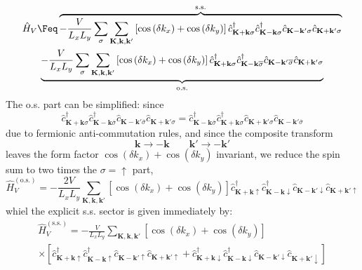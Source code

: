 \begin{multline*}
	\hat H_V \Feq 
	\overbrace{
		- \frac{V}{L_x L_y} \sum_{\sigma}
		\sum_{\mathbf{K}, \mathbf{k}, \mathbf{k}'} \left[
		\cos \left(
		\delta k_x
		\right)	+ \cos \left(
		\delta k_y
		\right)	
		\right]	\hat c_{\mathbf{K}+\mathbf{k} \sigma}^\dagger \hat c_{\mathbf{K}-\mathbf{k}\sigma}^\dagger \hat c_{\mathbf{K}-\mathbf{k}'\sigma} \hat c_{\mathbf{K}+\mathbf{k}'\sigma}
	}^{\mathrm{s.s.}} \\
	\underbrace{
		- \frac{V}{L_x L_y} \sum_{\sigma}
		\sum_{\mathbf{K}, \mathbf{k}, \mathbf{k}'} \left[
		\cos \left(
		\delta k_x
		\right)	+ \cos \left(
		\delta k_y
		\right)	
		\right]	\hat c_{\mathbf{K}+\mathbf{k} \sigma}^\dagger \hat c_{\mathbf{K}-\mathbf{k}\overline{\sigma}}^\dagger \hat c_{\mathbf{K}-\mathbf{k}'\overline{\sigma}} \hat c_{\mathbf{K}+\mathbf{k}'\sigma}
	}_{\mathrm{o.s.}}
\end{multline*}
The o.s. part can be simplified: since
\[
\hat c_{\mathbf{K}+\mathbf{k} \sigma}^\dagger \hat c_{\mathbf{K}-\mathbf{k}\overline{\sigma}}^\dagger \hat c_{\mathbf{K}-\mathbf{k}'\overline{\sigma}} \hat c_{\mathbf{K}+\mathbf{k}'\sigma} = \hat c_{\mathbf{K}-\mathbf{k}\overline{\sigma}}^\dagger \hat c_{\mathbf{K}+\mathbf{k} \sigma}^\dagger \hat c_{\mathbf{K}+\mathbf{k}'\sigma} \hat c_{\mathbf{K}-\mathbf{k}'\overline{\sigma}} 
\]
due to fermionic anti-commutation rules, and since the composite transform
\[
\mathbf{k} \to -\mathbf{k}
\qquad
\mathbf{k}' \to -\mathbf{k}'	
\]
leaves the form factor $\cos \left( \delta k_x \right)	+ \cos \left( \delta k_y \right)$ invariant, we reduce the spin sum to two times the $\sigma=\uparrow$ part,
\begin{equation}\label{eq:HV-os-fourier}
	\hat H_V^{(\mathrm{o.s.})} = - \frac{2V}{L_x L_y}
	\sum_{\mathbf{K}, \mathbf{k}, \mathbf{k}'} \left[
	\cos \left(
	\delta k_x
	\right)	+ \cos \left(
	\delta k_y
	\right)	
	\right]	\hat c_{\mathbf{K}+\mathbf{k} \uparrow}^\dagger \hat c_{\mathbf{K}-\mathbf{k}\downarrow}^\dagger \hat c_{\mathbf{K}-\mathbf{k}'\downarrow} \hat c_{\mathbf{K}+\mathbf{k}'\uparrow}
\end{equation}
whiel the explicit s.s. sector is given immediately by:
\begin{multline}\label{eq:HV-ss-fourier}
	\hat H_V^{(\mathrm{s.s.})} = - \frac{V}{L_x L_y}
	\sum_{\mathbf{K}, \mathbf{k}, \mathbf{k}'} \left[
	\cos \left(
	\delta k_x
	\right)	+ \cos \left(
	\delta k_y
	\right)	
	\right]\\
	\times \left[
	\hat c_{\mathbf{K}+\mathbf{k} \uparrow}^\dagger \hat c_{\mathbf{K}-\mathbf{k}\uparrow}^\dagger \hat c_{\mathbf{K}-\mathbf{k}'\uparrow} \hat c_{\mathbf{K}+\mathbf{k}'\uparrow} + \hat c_{\mathbf{K}+\mathbf{k} \downarrow}^\dagger \hat c_{\mathbf{K}-\mathbf{k}\downarrow}^\dagger \hat c_{\mathbf{K}-\mathbf{k}'\downarrow} \hat c_{\mathbf{K}+\mathbf{k}'\downarrow}
	\right]
\end{multline}

